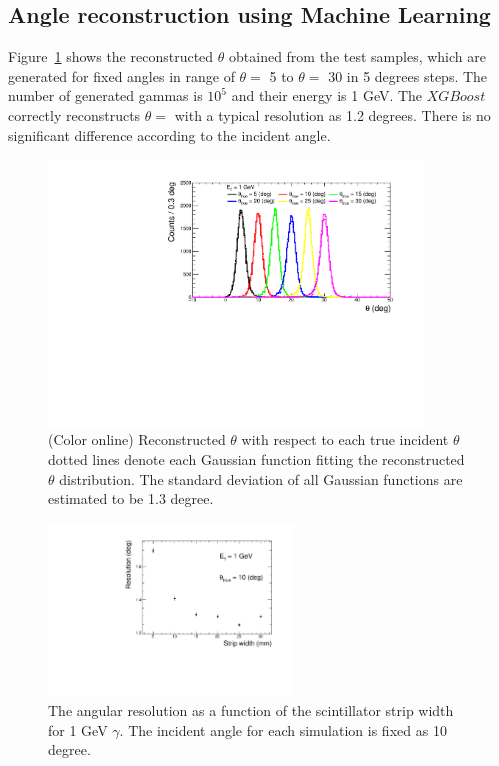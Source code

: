 \documentclass[jkps,preprint,fleqn,showpacs,showkeys]{revtex4}
\newcommand{\XGB}{XGBoost}
\begin{document}
\subsection{Angle reconstruction using Machine Learning}

Figure~\ref{fig:angle_reco_def} shows the reconstructed $\theta$ obtained from the test samples, which are generated for fixed angles in range of $\theta=$ 5 to $\theta=$ 30 in 5 degrees steps. The number of generated gammas is $10^5$ and their energy is 1 GeV. The $\XGB$ correctly reconstructs $\theta=$ with a typical resolution as 1.2 degrees. There is no significant difference according to the incident angle. 

\begin{figure}[!hbt]
\includegraphics[width=0.89\textwidth]{figures/Fig1_reco_def.pdf}
\caption{ (Color online) Reconstructed $\theta$ with respect to each true incident $\theta$ dotted lines denote each Gaussian function fitting the reconstructed $\theta$ distribution. The standard deviation of all Gaussian functions are estimated to be 1.3 degree.}
\label{fig:angle_reco_def}
\end{figure}


\begin{figure}[!hbt]
\includegraphics[width=0.58\textwidth]{figures/Fig2_reco_Width_width.pdf}
\caption{ The angular resolution as a function of the scintillator strip width for 1 GeV $\gamma$. The incident angle for each simulation is fixed as 10 degree.  }
\label{fig:angle_reco_width}
\end{figure}
\end{document}
